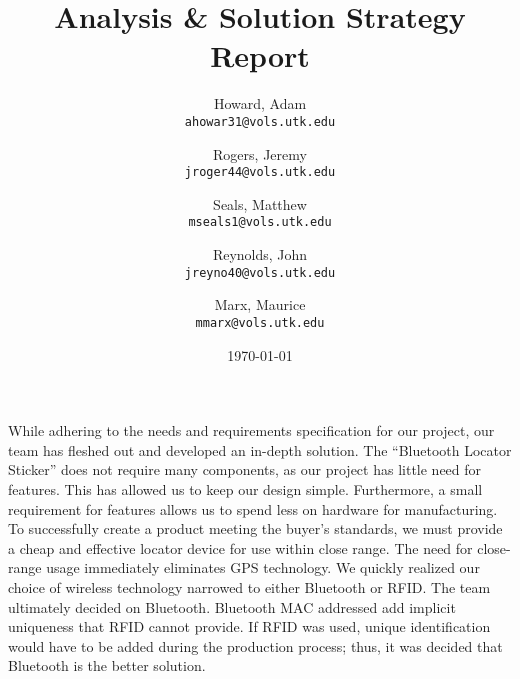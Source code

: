 \documentclass[12pt]{article}
\author{
  Howard, Adam\\
  \texttt{ahowar31@vols.utk.edu}
  \and
  Rogers, Jeremy\\
  \texttt{jroger44@vols.utk.edu}
  \and
  Seals, Matthew\\
  \texttt{mseals1@vols.utk.edu}
  \and
  Reynolds, John\\
  \texttt{jreyno40@vols.utk.edu}
  \and
  Marx, Maurice\\
  \texttt{mmarx@vols.utk.edu}
}
\title{Analysis \& Solution Strategy Report}
\date{\today}
\begin{document}
  \maketitle
  \pagebreak
  \vspace{16 pt}

  While adhering to the needs and requirements specification for our project, our team has fleshed out and
  developed an in-depth solution. The ``Bluetooth Locator Sticker'' does not require many components, as our
  project has little need for features. This has allowed us to keep our design simple. Furthermore, a small
  requirement for features allows us to spend less on hardware for manufacturing. To successfully create a 
  product meeting the buyer's standards, we must provide a cheap and effective locator device for use within
  close range. The need for close-range usage immediately eliminates GPS technology. We quickly realized our
  choice of wireless technology narrowed to either Bluetooth or RFID. The team ultimately decided on Bluetooth.
  Bluetooth MAC addressed add implicit uniqueness that RFID cannot provide. If RFID was used, unique
  identification would have to be added during the production process; thus, it was decided that Bluetooth
  is the better solution.

  \vspace{16 pt}
\end{document}
